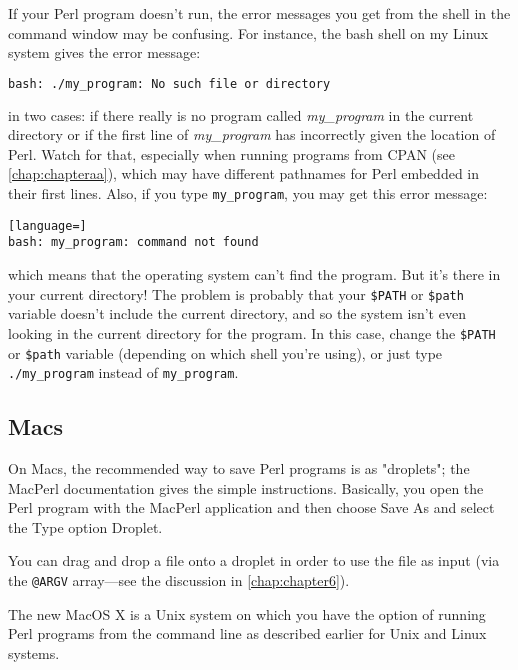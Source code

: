 If your Perl program doesn't run, the error messages you get from the shell in the command window may be confusing. For instance, the bash shell on my Linux system gives the error message:

\begin{lstlisting}[language=bash]
bash: ./my_program: No such file or directory
\end{lstlisting}

in two cases: if there really is no program called \textit{my\_program} in the current directory or if the first line of \textit{my\_program} has incorrectly given the location of Perl. Watch for that, especially when running programs from CPAN (see \autoref{chap:chapteraa}), which may have different pathnames for Perl embedded in their first lines. Also, if you type \verb|my_program|, you may get this error message:

\begin{lstlisting}[language=]
bash: my_program: command not found
\end{lstlisting}

which means that the operating system can't find the program. But it's
there in your current directory! The problem is probably that your
\verb|$PATH| or \verb|$path| variable doesn't include the current
directory, and so the system isn't even looking in the current directory
for the program. In this case, change the \verb|$PATH| or \verb|$path|
variable (depending on which shell you're using), or just type \verb|./my_program| instead of \verb|my_program|.  

\subsection{Macs}
On Macs, the recommended way to save Perl programs is as "droplets"; the MacPerl documentation gives the simple instructions. Basically, you open the Perl program with the MacPerl application and then choose Save As and select the Type option Droplet.

You can drag and drop a file onto a droplet in order to use the file as input (via the \verb|@ARGV| array—see the discussion in \autoref{chap:chapter6}).

The new MacOS X is a Unix system on which you have the option of running Perl programs from the command line as described earlier for Unix and Linux systems.

